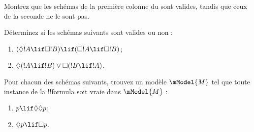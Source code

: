 \documentclass[../../../include/open-logic-section]{subfiles}
\begin{document}
\begin{prob}%
  Montrez que les schémas de la première colonne du
   sont valides,
  tandis que ceux de la seconde ne le sont pas.
\end{prob}

\begin{prob}
  Déterminez si les schémas suivants sont valides ou non :
  \begin{enumerate}
  \item $(\Diamond !A \lif \Box !B) \lif (\Box !A \lif \Box
    !B)$;
  \item $\Diamond(!A \lif !B) \lor \Box(!B \lif !A)$.
  \end{enumerate}
\end{prob}

\begin{prob}
  Pour chacun des schémas suivants, trouvez un modèle
  $\mModel{M}$ tel que toute instance de la !!{formula} soit
  vraie dans $\mModel{M}$ :
  \begin{enumerate}
  \item $p \lif \Diamond\Diamond p$;
  \item $\Diamond p \lif \Box p$.
  \end{enumerate}
\end{prob}
\end{document}
